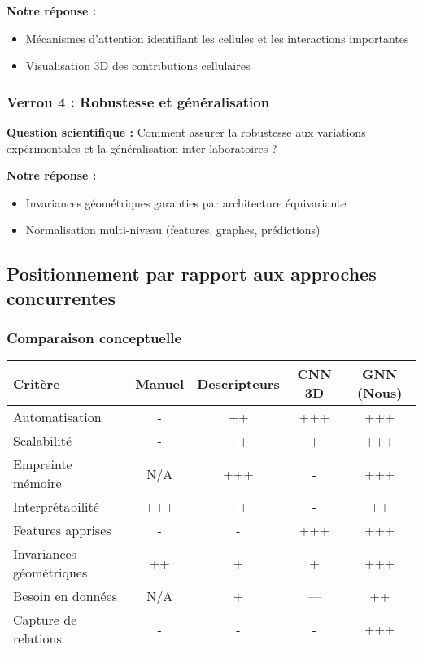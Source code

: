 \textbf{Notre réponse :}
\begin{itemize}
    \item Mécanismes d'attention identifiant les cellules et les interactions importantes
    \item Visualisation 3D des contributions cellulaires
\end{itemize}

\subsubsection{Verrou 4 : Robustesse et généralisation}

\textbf{Question scientifique :} Comment assurer la robustesse aux variations expérimentales et la généralisation inter-laboratoires ?

\textbf{Notre réponse :}
\begin{itemize}
    \item Invariances géométriques garanties par architecture équivariante
    \item Normalisation multi-niveau (features, graphes, prédictions)
\end{itemize}

\subsection{Positionnement par rapport aux approches concurrentes}

\subsubsection{Comparaison conceptuelle}

\begin{center}
\begin{tabular}{|l|c|c|c|c|}
\hline
\textbf{Critère} & \textbf{Manuel} & \textbf{Descripteurs} & \textbf{CNN 3D} & \textbf{GNN (Nous)} \\
\hline
Automatisation & - & ++ & +++ & +++ \\
Scalabilité & - & ++ & + & +++ \\
Empreinte mémoire & N/A & +++ & - & +++ \\
Interprétabilité & +++ & ++ & - & ++ \\
Features apprises & - & - & +++ & +++ \\
Invariances géométriques & ++ & + & + & +++ \\
Besoin en données & N/A & + & --- & ++ \\
Capture de relations & - & - & - & +++ \\
\hline
\end{tabular}
\end{center}

